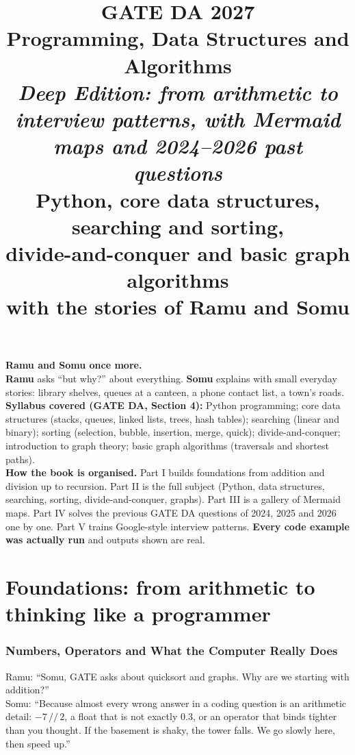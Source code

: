 \documentclass[11pt,a4paper]{article}
\title{\Huge\bfseries GATE DA 2027\\[4pt] \Large Programming, Data Structures and Algorithms\\[2pt]\large\emph{Deep Edition: from arithmetic to interview patterns, with Mermaid maps and 2024--2026 past questions}\\[8pt]
\large Python, core data structures, searching and sorting,\\divide-and-conquer and basic graph algorithms\\
with the stories of Ramu and Somu}
\author{}
\date{}
\begin{document}
\maketitle
\thispagestyle{empty}

\begin{center}
\begin{tcolorbox}[colback=yellow!10,colframe=orange!80!black,width=0.9\textwidth,breakable]
\textbf{Ramu and Somu once more.}\\
\textbf{Ramu} asks ``but why?'' about everything. \textbf{Somu} explains with small everyday stories: library shelves, queues at a canteen, a phone contact list, a town's roads.\\[4pt]
\textbf{Syllabus covered (GATE DA, Section 4):} Python programming; core data structures (stacks, queues, linked lists, trees, hash tables); searching (linear and binary); sorting (selection, bubble, insertion, merge, quick); divide-and-conquer; introduction to graph theory; basic graph algorithms (traversals and shortest paths).\\[4pt]
\textbf{How the book is organised.} Part I builds foundations from addition and division up to recursion. Part II is the full subject (Python, data structures, searching, sorting, divide-and-conquer, graphs). Part III is a gallery of Mermaid maps. Part IV solves the previous GATE DA questions of 2024, 2025 and 2026 one by one. Part V trains Google-style interview patterns. \textbf{Every code example was actually run} and outputs shown are real.
\end{tcolorbox}
\end{center}

\tableofcontents
\newpage

\part{Foundations: from arithmetic to thinking like a programmer}

\section{Numbers, Operators and What the Computer Really Does}
\begin{story}
Ramu: ``Somu, GATE asks about quicksort and graphs. Why are we starting with addition?''\\
Somu: ``Because almost every wrong answer in a coding question is an arithmetic detail: $-7\,//\,2$, a float that is not exactly $0.3$, or an operator that binds tighter than you thought. If the basement is shaky, the tower falls. We go slowly here, then speed up.''
\end{story}
\end{document}
